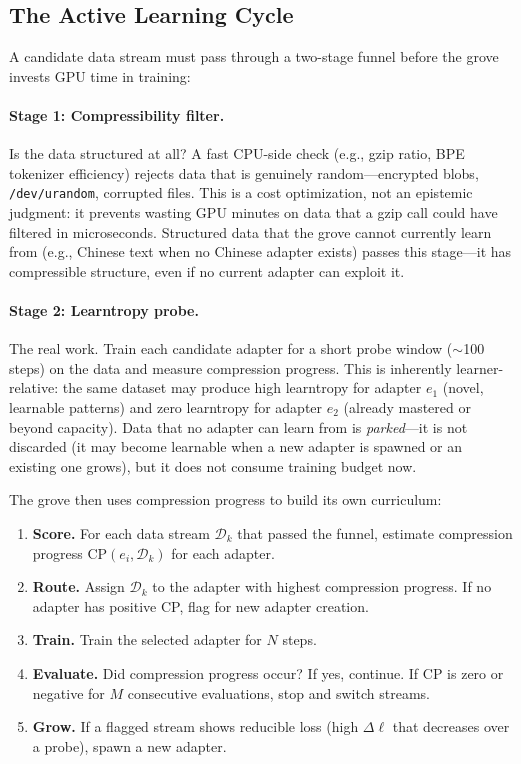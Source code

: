 \documentclass{article}
\begin{document}
\subsection{The Active Learning Cycle}
\label{sec:active-cycle}

A candidate data stream must pass through a two-stage funnel before
the grove invests GPU time in training:

\paragraph{Stage 1: Compressibility filter.} Is the data structured at
all? A fast CPU-side check (e.g., gzip ratio, BPE tokenizer efficiency)
rejects data that is genuinely random---encrypted blobs,
\texttt{/dev/urandom}, corrupted files. This is a cost optimization, not
an epistemic judgment: it prevents wasting GPU minutes on data that a
gzip call could have filtered in microseconds. Structured data that the
grove cannot currently learn from (e.g., Chinese text when no Chinese
adapter exists) passes this stage---it has compressible structure, even
if no current adapter can exploit it.

\paragraph{Stage 2: Learntropy probe.} The real work. Train each
candidate adapter for a short probe window ($\sim$100 steps) on the
data and measure compression progress. This is inherently
learner-relative: the same dataset may produce high learntropy for
adapter $e_1$ (novel, learnable patterns) and zero learntropy for
adapter $e_2$ (already mastered or beyond capacity). Data that no
adapter can learn from is \emph{parked}---it is not discarded (it may
become learnable when a new adapter is spawned or an existing one
grows), but it does not consume training budget now.

The grove then uses compression progress to build its own curriculum:

\begin{enumerate}[nosep,leftmargin=1.5em]
\item \textbf{Score.} For each data stream $\mathcal{D}_k$ that passed
      the funnel, estimate compression progress
      $\text{CP}(e_i, \mathcal{D}_k)$ for each adapter.
\item \textbf{Route.} Assign $\mathcal{D}_k$ to the adapter with
      highest compression progress. If no adapter has
      positive CP, flag for new adapter creation.
\item \textbf{Train.} Train the selected adapter for $N$ steps.
\item \textbf{Evaluate.} Did compression progress occur?
      If yes, continue. If CP is zero or negative
      for $M$ consecutive evaluations, stop and switch streams.
\item \textbf{Grow.} If a flagged stream shows reducible loss
      (high $\Delta\ell$ that decreases over a probe), spawn a new
      adapter.
\end{enumerate}
\end{document}

